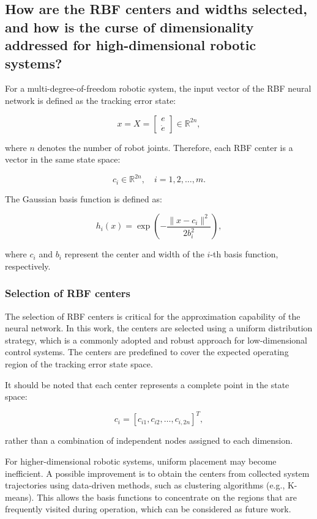 \subsection{How are the RBF centers and widths selected, and how is the curse of dimensionality addressed for high-dimensional robotic systems?}

For a multi-degree-of-freedom robotic system, the input vector of the RBF neural network is defined as the tracking error state:

\[
x=X=
\begin{bmatrix}
	e\\
	\dot e
\end{bmatrix}
\in\mathbb{R}^{2n},
\]

where $n$ denotes the number of robot joints. Therefore, each RBF center is a vector in the same state space:

\[
c_i\in\mathbb{R}^{2n},\quad i=1,2,\dots,m .
\]

The Gaussian basis function is defined as:

\[
h_i(x)=
\exp
\left(
-\frac{\|x-c_i\|^2}{2b_i^2}
\right),
\]

where $c_i$ and $b_i$ represent the center and width of the $i$-th basis function, respectively.


\subsubsection{Selection of RBF centers}

The selection of RBF centers is critical for the approximation capability of the neural network. In this work, the centers are selected using a uniform distribution strategy, which is a commonly adopted and robust approach for low-dimensional control systems. The centers are predefined to cover the expected operating region of the tracking error state space.

It should be noted that each center represents a complete point in the state space:

\[
c_i=
[c_{i1},c_{i2},\dots,c_{i,2n}]^T ,
\]

rather than a combination of independent nodes assigned to each dimension.

For higher-dimensional robotic systems, uniform placement may become inefficient. A possible improvement is to obtain the centers from collected system trajectories using data-driven methods, such as clustering algorithms (e.g., K-means). This allows the basis functions to concentrate on the regions that are frequently visited during operation, which can be considered as future work.


